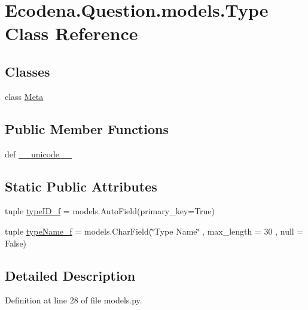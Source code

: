 \hypertarget{class_ecodena_1_1_question_1_1models_1_1_type}{
\section{Ecodena.Question.models.Type Class Reference}
\label{d4/d6c/class_ecodena_1_1_question_1_1models_1_1_type}
}
\subsection*{Classes}
\begin{DoxyCompactItemize}
\item 
class \hyperlink{class_ecodena_1_1_question_1_1models_1_1_type_1_1_meta}{Meta}
\end{DoxyCompactItemize}
\subsection*{Public Member Functions}
\begin{DoxyCompactItemize}
\item 
def \hyperlink{class_ecodena_1_1_question_1_1models_1_1_type_a93856158301bf1adb087684943ef9483}{\_\-\_\-unicode\_\-\_\-}
\end{DoxyCompactItemize}
\subsection*{Static Public Attributes}
\begin{DoxyCompactItemize}
\item 
tuple \hyperlink{class_ecodena_1_1_question_1_1models_1_1_type_a40ce13fbc80fa5236e6a44ffa05ce2f3}{typeID\_\-f} = models.AutoField(primary\_\-key=True)
\item 
tuple \hyperlink{class_ecodena_1_1_question_1_1models_1_1_type_a59414f1e8b717e74171c97e897f08800}{typeName\_\-f} = models.CharField(\char`\"{}Type Name\char`\"{} , max\_\-length = 30 , null = False)
\end{DoxyCompactItemize}


\subsection{Detailed Description}


Definition at line 28 of file models.py.



